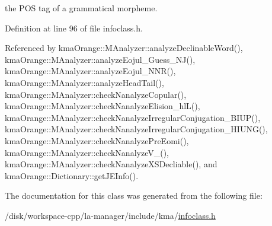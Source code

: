 the POS tag of a grammatical morpheme. 



Definition at line 96 of file infoclass.h.

Referenced by kmaOrange::MAnalyzer::analyzeDeclinableWord(), kmaOrange::MAnalyzer::analyzeEojul\_\-Guess\_\-NJ(), kmaOrange::MAnalyzer::analyzeEojul\_\-NNR(), kmaOrange::MAnalyzer::analyzeHeadTail(), kmaOrange::MAnalyzer::checkNanalyzeCopular(), kmaOrange::MAnalyzer::checkNanalyzeElision\_\-hlL(), kmaOrange::MAnalyzer::checkNanalyzeIrregularConjugation\_\-BIUP(), kmaOrange::MAnalyzer::checkNanalyzeIrregularConjugation\_\-HIUNG(), kmaOrange::MAnalyzer::checkNanalyzePreEomi(), kmaOrange::MAnalyzer::checkNanalyzeV\_\-(), kmaOrange::MAnalyzer::checkNanalyzeXSDecliable(), and kmaOrange::Dictionary::getJEInfo().

The documentation for this class was generated from the following file:\begin{CompactItemize}
\item 
/disk/workspace-cpp/la-manager/include/kma/\hyperlink{infoclass_8h}{infoclass.h}\end{CompactItemize}
